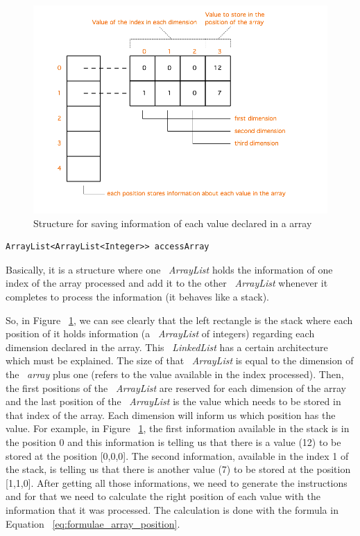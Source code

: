 \documentclass[
  oneside,
  11pt, a4paper,
  footinclude=true,
  headinclude=true,
  cleardoublepage=empty
]{scrbook}
\begin{document}
\begin{figure}[h!]
  \centering
    \includegraphics[width=1\textwidth]{img/access_array.png}
    \caption{Structure for saving information of each value declared in a array}
    \label{fig:access_array_structure}
\end{figure}

\begin{lstlisting}[caption={Structure of saving informations of each index in JAVA},label={lst:access_array_structure}]
  ArrayList<ArrayList<Integer>> accessArray
\end{lstlisting}

Basically, it is a structure where one ~\textit{ArrayList} holds the information of one index of the array processed and add it to the other ~\textit{ArrayList} whenever it completes to process the information (it behaves like a stack).

So, in Figure ~\ref{fig:access_array_structure}, we can see clearly that the left rectangle is the stack where each position of it holds information (a ~\textit{ArrayList} of integers) regarding each dimension declared in the array.
This ~\textit{LinkedList} has a certain architecture which must be explained.
The size of that ~\textit{ArrayList} is equal to the dimension of the ~\textit{array} plus one (refers to the value available in the index processed). Then, the first positions of the ~\textit{ArrayList} are reserved for each dimension of the array and the last position of the ~\textit{ArrayList} is the value which needs to be stored in that index of the array.
Each dimension will inform us which position has the value.
For example, in Figure ~\ref{fig:access_array_structure}, the first information available in the stack is in the position 0 and this information is telling us that there is a value (12) to be stored at the position [0,0,0]. The second information, available in the index 1 of the stack, is telling us that there is another value (7) to be stored at the position [1,1,0].
After getting all those informations, we need to generate the instructions and for that we need to calculate the right position of each value with the information that it was processed.
The calculation is done with the formula in Equation ~\ref{eq:formulae_array_position}.
\end{document}
